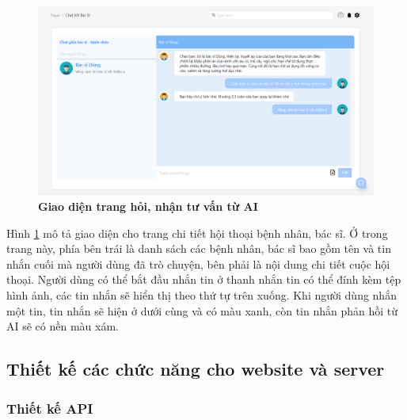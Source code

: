 \begin{figure}[H]
  \centering
  \includegraphics[scale=0.5]{Images/server/webUI/chat.png}
  \caption[Giao diện trang chi tiết hội thoại bệnh nhân, bác sĩ]{\bfseries \fontsize{12pt}{0pt}\selectfont Giao diện trang hỏi, nhận tư vấn từ AI}
  \label{chat} %
\end{figure}

Hình \ref{chat} mô tả giao diện cho trang chi tiết hội thoại bệnh nhân, bác sĩ. Ở trong trang này, phía bên trái là danh sách các bệnh nhân, bác sĩ 
bao gồm tên và tin nhắn cuối mà người dùng đã trò chuyện, bên phải là nội dung chi tiết cuộc hội thoại. Người dùng có thể bắt đầu nhắn tin ở thanh nhắn tin 
có thể đính kèm tệp hình ảnh, các tin nhắn sẽ hiển thị theo thứ tự trên xuống. Khi người dùng nhắn một tin, tin nhắn sẽ hiện ở dưới cùng và 
có màu xanh, còn tin nhắn phản hồi từ AI sẽ có nền màu xám. 

\subsection{Thiết kế các chức năng cho website và server}

\subsubsection{Thiết kế API}


